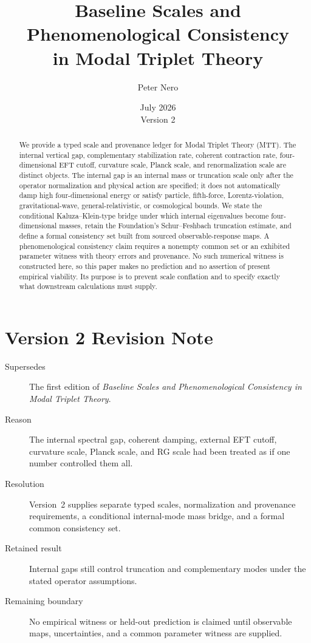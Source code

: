 \documentclass[11pt]{article}
\title{Baseline Scales and Phenomenological Consistency\\
in Modal Triplet Theory}
\author{Peter Nero}
\date{July 2026\\Version 2}
\begin{document}
\maketitle
\seriestagline

\begin{abstract}
We provide a typed scale and provenance ledger for Modal Triplet Theory
(MTT). The internal vertical gap, complementary stabilization rate, coherent
contraction rate, four-dimensional EFT cutoff, curvature scale, Planck scale,
and renormalization scale are distinct objects. The internal gap is an internal
mass or truncation scale only after the operator normalization and physical
action are specified; it does not automatically damp high four-dimensional
energy or satisfy particle, fifth-force, Lorentz-violation, gravitational-wave,
general-relativistic, or cosmological bounds. We state the conditional
Kaluza--Klein-type bridge under which internal eigenvalues become
four-dimensional masses, retain the Foundation's Schur--Feshbach truncation
estimate, and define a formal consistency set built from
sourced observable-response maps. A phenomenological consistency claim
requires a nonempty common set or an exhibited parameter witness with theory
errors and provenance. No such numerical witness is constructed here, so this
paper makes no prediction and no assertion of present empirical viability. Its
purpose is to prevent scale conflation and to specify exactly what downstream
calculations must supply.
\end{abstract}

\section*{Version 2 Revision Note}
\begin{description}
\item[Supersedes] The first edition of \emph{Baseline Scales and
Phenomenological Consistency in Modal Triplet Theory}.
\item[Reason] The internal spectral gap, coherent damping, external EFT
cutoff, curvature scale, Planck scale, and RG scale had been treated as if one
number controlled them all.
\item[Resolution] Version~2 supplies separate typed scales, normalization and
provenance requirements, a conditional internal-mode mass bridge, and a formal
common consistency set.
\item[Retained result] Internal gaps still control truncation and
complementary modes under the stated operator assumptions.
\item[Remaining boundary] No empirical witness or held-out prediction is
claimed until observable maps, uncertainties, and a common parameter witness
are supplied.
\end{description}
\end{document}
